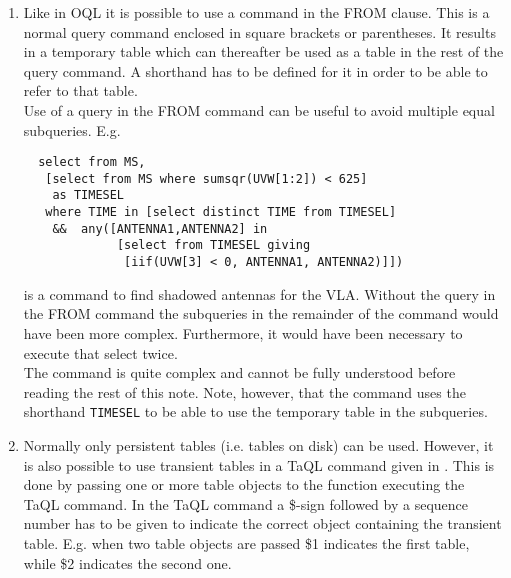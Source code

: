 \begin{description}
\begin{enumerate}
       \item
       Like in OQL it is possible to use a
       command in the FROM clause. This is a normal query command
       enclosed in square brackets or parentheses.
       It results in a temporary table
       which can thereafter be used as a table in the rest of the
       query command. A shorthand has to be defined for it in order
       to be able to refer to that table.
       \\Use of a query in the FROM command can be useful to avoid
       multiple equal subqueries. E.g.
       \begin{verbatim}
  select from MS,
   [select from MS where sumsqr(UVW[1:2]) < 625]
    as TIMESEL
   where TIME in [select distinct TIME from TIMESEL]
    &&  any([ANTENNA1,ANTENNA2] in
             [select from TIMESEL giving
              [iif(UVW[3] < 0, ANTENNA1, ANTENNA2)]])
       \end{verbatim}
       is a command to find shadowed antennas for the VLA.
       Without the query in the FROM command the subqueries in the
       remainder of the command would have been more complex.
       Furthermore, it would have been necessary to execute that
       select twice.
       \\The command is quite complex and cannot be fully understood
       before reading the rest of this note.
       Note, however, that the command uses the shorthand \texttt{TIMESEL}
       to be able to use the temporary table in the subqueries.

       \item
       Normally only persistent tables (i.e. tables on disk) can
       be used. However, it is also possible to use transient tables
       in a TaQL command given in .
       This is done by passing one or more table objects to the
       function executing the TaQL command. In the TaQL command a
       \$-sign followed by a sequence number has to be given to
       indicate the correct object containing the transient table.
       E.g. when two
       table objects are passed \$1 indicates the first table, while \$2
       indicates the second one.
     \end{enumerate}


\end{description}
